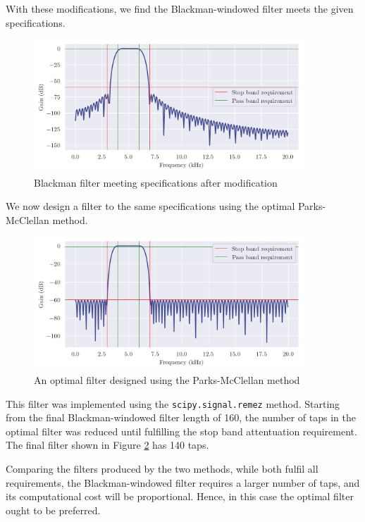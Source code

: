\newpage

With these modifications, we find the Blackman-windowed filter meets the given specifications.

\begin{figure}[ht]
    \centering
    \includegraphics[width=0.9\textwidth]{images/q3_blackman_freqz.png}
    \caption{Blackman filter meeting specifications after modification}
    \label{fig:q3_blackman_freqz}
\end{figure}

We now design a filter to the same specifications using the optimal Parks-McClellan method.

\begin{figure}[ht]
    \centering
    \includegraphics[width=0.9\textwidth]{images/q3_optimal_freqz.png}
    \caption{An optimal filter designed using the Parks-McClellan method}
    \label{fig:q3_optimal_freqz}
\end{figure}

This filter was implemented using the \texttt{scipy.signal.remez} method. Starting from the final Blackman-windowed filter length of 160, the number of taps in the optimal filter was reduced until fulfilling the stop band attentuation requirement. The final filter shown in Figure \ref{fig:q3_optimal_freqz} has 140 taps.

Comparing the filters produced by the two methods, while both fulfil all requirements, the Blackman-windowed filter requires a larger number of taps, and its computational cost will be proportional. Hence, in this case the optimal filter ought to be preferred.
